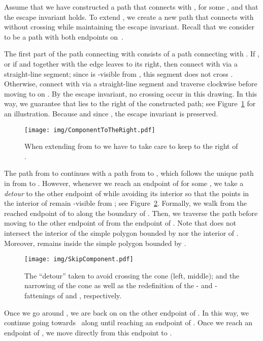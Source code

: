 \documentclass[11pt]{patmorin}
\begin{document}
Assume that we have constructed a path  that connects  with , for some , and that the escape invariant holds.  To extend , we create a new path that connects  with  without crossing  while maintaining the escape invariant.  Recall that we consider  to be a path with both endpoints on~.

The first part of the path connecting  with  consists of a path connecting  with . If , or if  and  together with the edge  leaves  to its right, then connect  with  via a straight-line segment; since  is -visible from , this segment does not cross . Otherwise, connect  with  via a straight-line segment and traverse  clockwise before moving to  on .  By the escape invariant, no crossing occur in this drawing.  In this way, we guarantee that  lies to the right of the constructed path; see Figure~\ref{fig: Component to the right} for an illustration. Because  and since , the escape invariant is preserved.

\begin{figure}[tb]
\centering
\texttt{[image: img/ComponentToTheRight.pdf]}
\caption{When extending  from  to  we have to take care to
    keep  to the right of .}
\label{fig: Component to the right}
\end{figure}

The path from  to  continues with a path from  to , which follows the unique path in  from  to . However, whenever we reach an endpoint of  for some , we take a \emph{detour} to the other endpoint of  while avoiding its interior so that the points in the interior of  remain -visible from ; see Figure~\ref{fig:Skip Component}. Formally, we walk from the reached endpoint of  to  along the boundary of . Then, we traverse the path  before moving to the other endpoint of  from the endpoint of . Note that  does not intersect the interior of the simple polygon bounded by  nor the interior of . Moreover,  remains inside the simple polygon bounded by .


\begin{figure}[tb]
\centering
\texttt{[image: img/SkipComponent.pdf]}
\caption{The ``detour'' taken to avoid crossing the cone  (left, middle); and the narrowing of the cone  as well as the redefinition of the - and -fattenings of  and , respectively.}
\label{fig:Skip Component}
\end{figure}

Once we go around , we are back on  on the other endpoint of . In this way, we continue going towards~ along  until reaching an endpoint of .
Once we reach an endpoint of , we move directly from this endpoint to .
\end{document}
